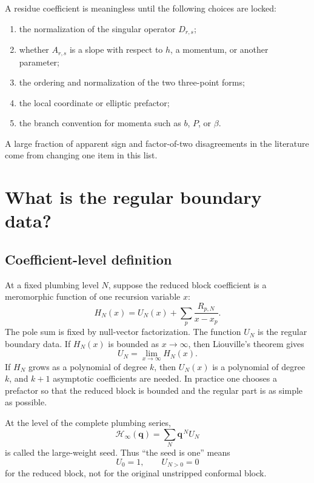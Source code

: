 \documentclass[11pt]{article}
\newcommand{\Hh}{\mathcal H}
\newcommand{\bvec}{\bm}
\begin{document}
A residue coefficient is meaningless until the following choices are
locked:
\begin{enumerate}
 \item the normalization of the singular operator \(D_{r,s}\);
 \item whether \(A_{r,s}\) is a slope with respect to \(h\), a momentum, or
 another parameter;
 \item the ordering and normalization of the two three-point forms;
 \item the local coordinate or elliptic prefactor;
 \item the branch convention for momenta such as \(b\), \(P\), or \(\beta\).
\end{enumerate}
A large fraction of apparent sign and factor-of-two disagreements in the
literature come from changing one item in this list.

\section{What is the regular boundary data?}
\label{sec:regular-boundary}

\subsection{Coefficient-level definition}

At a fixed plumbing level \(N\), suppose the reduced block coefficient is a
meromorphic function of one recursion variable \(x\):
\begin{equation}
 H_N(x)
 =
 U_N(x)
 +
 \sum_p\frac{R_{p,N}}{x-x_p}.
 \label{eq:coefficient-partial-fraction}
\end{equation}
The pole sum is fixed by null-vector factorization.  The function \(U_N\) is
the regular boundary data.  If \(H_N(x)\) is bounded as \(x\to\infty\), then
Liouville's theorem gives
\begin{equation}
 U_N=\lim_{x\to\infty}H_N(x).
 \label{eq:bounded-regular-part}
\end{equation}
If \(H_N\) grows as a polynomial of degree \(k\), then \(U_N(x)\) is a
polynomial of degree \(k\), and \(k+1\) asymptotic coefficients are needed.
In practice one chooses a prefactor so that the reduced block is bounded and
the regular part is as simple as possible.

At the level of the complete plumbing series,
\begin{equation}
 \Hh_\infty(\bvec q)
 =
 \sum_N \bvec q^{\,N} U_N
 \label{eq:complete-seed}
\end{equation}
is called the large-weight seed.  Thus ``the seed is one'' means
\begin{equation}
 U_0=1,\qquad U_{N>0}=0
\end{equation}
for the reduced block, not for the original unstripped conformal block.
\end{document}
